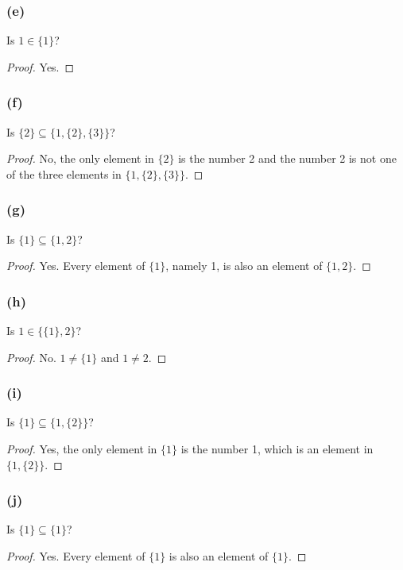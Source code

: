 \documentclass[14pt]{extarticle}
\begin{document}
\subsubsection{(e)}
Is $1 \in \{1\}$?

\begin{proof}
    Yes.
\end{proof}

\subsubsection{(f)}
Is $\{2\} \subseteq \{1, \{2\}, \{3\}\}$?

\begin{proof}
    No, the only element in $\{2\}$ is the number 2 and the number 2 is not one of
    the three elements in $\{1, \{2\}, \{3\}\}$.
\end{proof}

\subsubsection{(g)}
Is $\{1\} \subseteq \{1, 2\}$?

\begin{proof}
    Yes. Every element of $\{1\}$, namely 1, is also an element of $\{1, 2\}$.
\end{proof}

\subsubsection{(h)}
Is $1 \in \{\{1\}, 2\}$?

\begin{proof}
    No. $1 \neq \{1\}$ and $1 \neq 2$.
\end{proof}

\subsubsection{(i)}
Is $\{1\} \subseteq  \{1, \{2\}\}$?

\begin{proof}
    Yes, the only element in $\{1\}$ is the number 1, which is an element in
    $\{1, \{2\}\}$.
\end{proof}

\subsubsection{(j)}
Is $\{1\} \subseteq \{1\}$?

\begin{proof}
    Yes. Every element of $\{1\}$ is also an element of $\{1\}$.
\end{proof}
\end{document}
